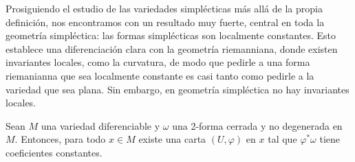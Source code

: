 Prosiguiendo el estudio de las variedades simplécticas más allá de la propia definición, nos encontramos con un resultado muy fuerte, central en toda la geometría simpléctica: las formas simplécticas son localmente constantes. Esto establece una diferenciación clara con la geometría riemanniana, donde existen invariantes locales, como la curvatura, de modo que pedirle a una forma riemanianna que sea localmente constante es casi tanto como pedirle a la variedad que sea plana. Sin embargo, en geometría simpléctica no hay invariantes locales. 

\begin{thm}[Darboux]
 Sean $M$ una variedad diferenciable y $\omega$ una 2-forma cerrada y no degenerada en $M$. Entonces, para todo $x\in M$ existe una carta $(U,\varphi)$ en $x$ tal que $\varphi^* \omega$ tiene coeficientes constantes.
\end{thm}

